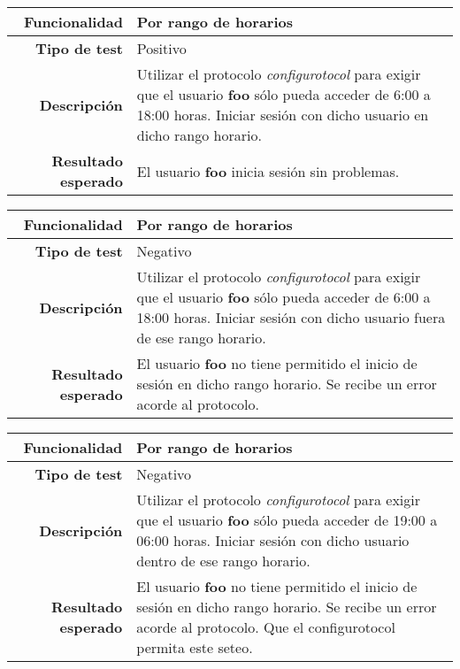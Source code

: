 \documentclass[a4paper,10pt]{article}
\begin{document}
\begin{center}
  \begin{tabular}{|r|p{12.5cm}|}
    \hline
    \textbf{Funcionalidad}	&	Por rango de horarios\\
    \hline
    \textbf{Tipo de test}	&	Positivo\\
    \hline
    \textbf{Descripción}	&	Utilizar el protocolo \textit{configurotocol} para exigir que el usuario
					\textbf{foo} sólo pueda acceder de 6:00 a 18:00 horas. Iniciar sesión con
					dicho usuario en dicho rango horario.\\
    \hline
    \textbf{Resultado esperado}	&	El usuario \textbf{foo} inicia sesión sin problemas.\\
    \hline   
  \end{tabular}
\end{center}

\begin{center}
  \begin{tabular}{|r|p{12.5cm}|}
    \hline
    \textbf{Funcionalidad}	&	Por rango de horarios\\
    \hline
    \textbf{Tipo de test}	&	Negativo\\
    \hline
    \textbf{Descripción}	&	Utilizar el protocolo \textit{configurotocol} para exigir que el usuario
					\textbf{foo} sólo pueda acceder de 6:00 a 18:00 horas. Iniciar sesión con
					dicho usuario fuera de ese rango horario.\\
    \hline
    \textbf{Resultado esperado}	&	El usuario \textbf{foo} no tiene permitido el inicio de sesión en dicho
					rango horario. Se recibe un error acorde al protocolo.\\
    \hline   
  \end{tabular}
\end{center}

\begin{center}
  \begin{tabular}{|r|p{12.5cm}|}
    \hline
    \textbf{Funcionalidad}	&	Por rango de horarios\\
    \hline
    \textbf{Tipo de test}	&	Negativo\\
    \hline
    \textbf{Descripción}	&	Utilizar el protocolo \textit{configurotocol} para exigir que el usuario
					\textbf{foo} sólo pueda acceder de 19:00 a 06:00 horas. Iniciar sesión con
					dicho usuario dentro de ese rango horario.\\
    \hline
    \textbf{Resultado esperado}	&	El usuario \textbf{foo} no tiene permitido el inicio de sesión en dicho
					rango horario. Se recibe un error acorde al protocolo. Que el configurotocol permita este seteo.\\
    \hline   
  \end{tabular}
\end{center}
\end{document}
